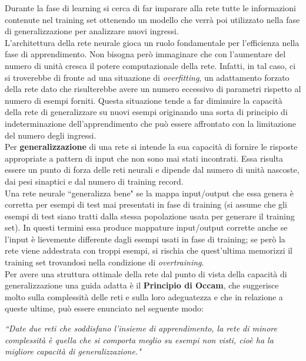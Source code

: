 \documentclass[12pt,a4paper,oneside]{book}
\begin{document}
		Durante la fase di learning si cerca di far imparare alla rete tutte le informazioni contenute nel training set ottenendo un modello che verrà poi utilizzato nella fase di generalizzazione per analizzare nuovi ingressi.\\  
		L’architettura della rete neurale gioca un ruolo fondamentale per l’efficienza nella fase di apprendimento. Non bisogna però immaginare che con l'aumentare del numero di unità cresca il potere computazionale della rete. Infatti, in tal caso, ci si troverebbe di fronte ad una situazione di \emph{overfitting}, un adattamento forzato della rete dato che risulterebbe avere un numero eccessivo di parametri rispetto al numero di esempi forniti. Questa situazione tende a far diminuire la capacità della rete di generalizzare su nuovi esempi originando una sorta di principio di indeterminazione dell'apprendimento che può essere affrontato con la limitazione del numero degli ingressi.\\ 
		Per \textbf{generalizzazione} di una rete si intende la sua capacità di fornire le risposte appropriate a pattern di input che non sono mai stati incontrati. Essa risulta essere un punto di forza delle reti neurali e dipende dal numero di unità nascoste, dai pesi sinaptici e dal numero di training record.\\
		Una rete neurale ``generalizza bene" se la mappa input/output che essa genera è corretta per esempi di test mai presentati in fase di training (si assume che gli esempi di test siano tratti dalla stessa popolazione usata per generare il training set). In questi termini essa produce mappature input/output corrette anche se l’input è lievemente differente dagli esempi usati in fase di training; se però la rete viene addestrata con troppi esempi, si rischia che quest'ultima memorizzi il training set trovandosi nella condizione di \emph{overtraining}. \\ 
		Per avere una struttura ottimale della rete dal punto di vista della capacità di generalizzazione una guida adatta è il \textbf{Principio di Occam}, che suggerisce molto sulla complessità delle reti e sulla loro adeguatezza e che in relazione a queste ultime, può essere enunciato nel seguente modo:
		
		\textit{``Date due reti che soddisfano l'insieme di apprendimento, la rete di minore complessità è quella che si comporta meglio su esempi non visti, cioè ha la migliore capacità di generalizzazione."}\\ 
		
		
	
\end{document}
